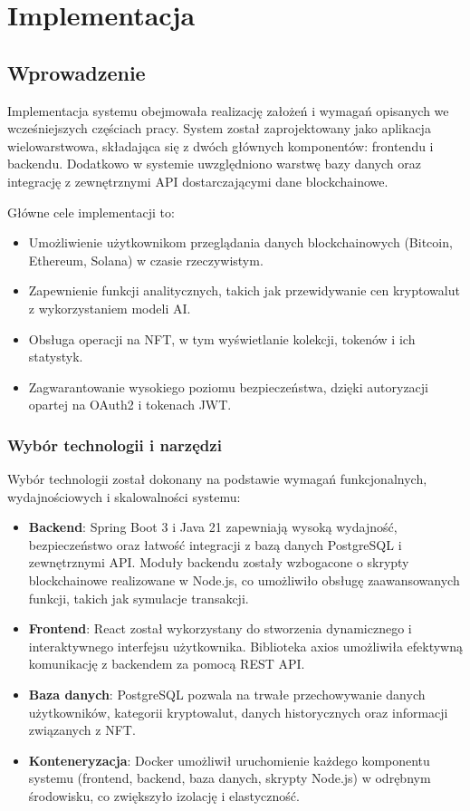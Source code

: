 \chapter{Implementacja}

\section{Wprowadzenie}

Implementacja systemu obejmowała realizację założeń i wymagań opisanych we wcześniejszych częściach pracy. System został zaprojektowany jako aplikacja wielowarstwowa, składająca się z dwóch głównych komponentów: frontendu i backendu. Dodatkowo w systemie uwzględniono warstwę bazy danych oraz integrację z zewnętrznymi API dostarczającymi dane blockchainowe.

Główne cele implementacji to:
\begin{itemize}
    \item Umożliwienie użytkownikom przeglądania danych blockchainowych (Bitcoin, Ethereum, Solana) w czasie rzeczywistym.
    \item Zapewnienie funkcji analitycznych, takich jak przewidywanie cen kryptowalut z wykorzystaniem modeli AI.
    \item Obsługa operacji na NFT, w tym wyświetlanie kolekcji, tokenów i ich statystyk.
    \item Zagwarantowanie wysokiego poziomu bezpieczeństwa, dzięki autoryzacji opartej na OAuth2 i tokenach JWT.
\end{itemize}

\subsection{Wybór technologii i narzędzi}
Wybór technologii został dokonany na podstawie wymagań funkcjonalnych, wydajnościowych i skalowalności systemu:
\begin{itemize}
    \item \textbf{Backend}: Spring Boot 3 i Java 21 zapewniają wysoką wydajność, bezpieczeństwo oraz łatwość integracji z bazą danych PostgreSQL i zewnętrznymi API. Moduły backendu zostały wzbogacone o skrypty blockchainowe realizowane w Node.js, co umożliwiło obsługę zaawansowanych funkcji, takich jak symulacje transakcji.
    \item \textbf{Frontend}: React został wykorzystany do stworzenia dynamicznego i interaktywnego interfejsu użytkownika. Biblioteka axios umożliwiła efektywną komunikację z backendem za pomocą REST API.
    \item \textbf{Baza danych}: PostgreSQL pozwala na trwałe przechowywanie danych użytkowników, kategorii kryptowalut, danych historycznych oraz informacji związanych z NFT.
    \item \textbf{Konteneryzacja}: Docker umożliwił uruchomienie każdego komponentu systemu (frontend, backend, baza danych, skrypty Node.js) w odrębnym środowisku, co zwiększyło izolację i elastyczność.
\end{itemize}

